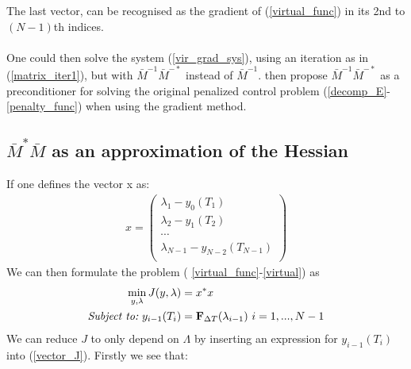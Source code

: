 The last vector, can be recognised as the gradient of (\ref{virtual_func}) in its 2nd to $(N-1)$th indices.
\\
\\ 
One could then solve the system (\ref{vir_grad_sys}), using an iteration as in (\ref{matrix_iter1}), but with $\bar{M}^{-1}\bar{M}^{-*}$ instead of $\bar{M}^{-1}$. \cite{maday2002parareal} then propose $\bar{M}^{-1}\bar{M}^{-*}$ as a preconditioner for solving the original penalized control problem (\ref{decomp_E}-\ref{penalty_func}) when using the gradient method. 
\subsection{$\bar{M}^{*}\bar{M}$ as an approximation of the Hessian}
If one defines the vector x as:
\begin{align}
x= \left( \begin{array}{c}  
   \lambda_1 - y_0(T_1) \\ 
   \lambda_2 - y_1(T_2) \\
   \cdots  \\
   \lambda_{N-1} -y_{N-2}(T_{N-1})  \\
   \end{array}  \right)
\end{align} 
We can then formulate the problem ( \ref{virtual_func}-\ref{virtual}) as 
\begin{align}
\min_{y,\lambda} J(y,\lambda) &= x^*x \label{vector_J}\\ 
\textit{Subject to:} \ y_{i-1}(T_i) &= \bold{F}_{\Delta T}(\lambda_{i-1}) \ i =1,...,N-1 
\end{align}
We can reduce $J$ to only depend on $\Lambda$ by inserting an expression for $y_{i-1}(T_i)$ into (\ref{vector_J}). Firstly we see that:
